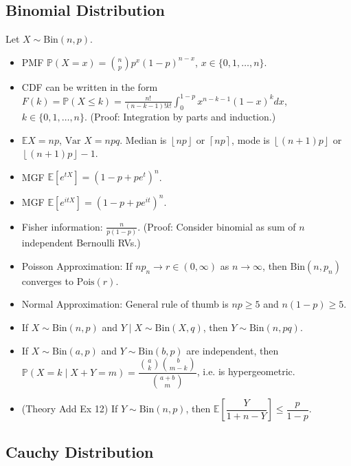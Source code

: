 \documentclass[twoside]{article}
\def\lc{\left\lceil}
\def\rc{\right\rceil}
\def\lf{\left\lfloor}
\def\rf{\right\rfloor}
\newcommand\bbE{\mathbb{E}}
\newcommand\bbP{\mathbb{P}}
\newcommand\goesto{\rightarrow}
\newcommand\var{\text{Var }}
\begin{document}
\subsection{Binomial Distribution}
Let $X \sim \text{Bin}(n,p)$.
\begin{itemize}
\item PMF $\bbP(X = x) = \binom{n}{p}p^x(1-p)^{n-x}$, $x \in \{ 0, 1, \dots, n\}$.

\item CDF can be written in the form $F(k) = \bbP(X \leq k) = \displaystyle\frac{n!}{(n-k-1)!k!} \int_0^{1-p} x^{n-k-1}(1-x)^k dx$, $k \in \{ 0, 1, \dots, n\}$. (Proof: Integration by parts and induction.)

\item $\bbE X = np$, $\var X = npq$. Median is $\lf np \rf$ or $\lc np \rc$, mode is $\lf (n+1)p \rf$ or $\lf (n+1)p \rf - 1$.

\item MGF $\bbE [e^{tX}] = (1 - p + pe^t)^n$.

\item MGF $\bbE [e^{itX}] = (1 - p + pe^{it})^n$.

\item Fisher information: $\displaystyle\frac{n}{p(1-p)}$. (Proof: Consider binomial as sum of $n$ independent Bernoulli RVs.)

\item Poisson Approximation: If $np_n \goesto r \in (0, \infty)$ as $n \goesto \infty$, then $\text{Bin}(n, p_n)$ converges to $\text{Pois}(r)$.

\item Normal Approximation: General rule of thumb is $np \geq 5$ and $n(1-p) \geq 5$.

\item If $X \sim \text{Bin}(n,p)$ and $Y \mid X \sim \text{Bin}(X, q)$, then $Y \sim \text{Bin}(n, pq)$.

\item If $X \sim \text{Bin}(a,p)$ and $Y \sim \text{Bin}(b,p)$ are independent, then $\bbP(X = k \mid X+Y = m) = \dfrac{\binom{a}{k}\binom{b}{m-k}}{\binom{a+b}{m}}$, i.e. is hypergeometric.

\item (Theory Add Ex 12) If $Y \sim \text{Bin}(n,p)$, then $\bbE \left[\dfrac{Y}{1+n-Y} \right] \leq \dfrac{p}{1-p}$.

\end{itemize}

\subsection{Cauchy Distribution}
\end{document}
